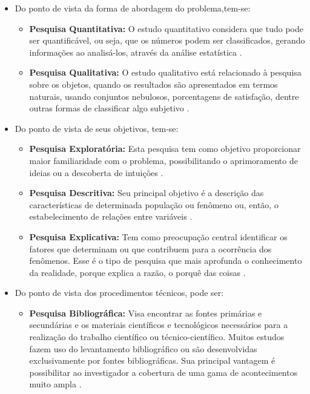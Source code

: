 \begin{apendicesenv}
\begin{itemize}
	\item Do ponto de vista da forma de abordagem do problema,tem-se:
		\begin{itemize}
			\item \textbf{Pesquisa Quantitativa:} O estudo quantitativo considera que tudo pode ser quantificável, ou seja, que os números podem ser classificados, gerando informações ao analisá-los, através da análise estatística \cite{Travassos:2002}.
			\item \textbf{Pesquisa Qualitativa:} O estudo qualitativo está relacionado à pesquisa sobre os objetos, quando os resultados são apresentados em termos naturais, usando conjuntos nebulosos, porcentagens de satisfação, dentre outras formas de classificar algo subjetivo \cite{Travassos:2002}.
		\end{itemize}

	\item Do ponto de vista de seus objetivos, tem-se:
		\begin{itemize}
			\item \textbf{Pesquisa Exploratória:} Esta pesquisa tem como objetivo proporcionar maior familiaridade com o problema, possibilitando o aprimoramento de ideias ou a descoberta de intuições \cite{Gil:2010}.
			\item \textbf{Pesquisa Descritiva:} Seu principal objetivo é a descrição das características de determinada população ou fenômeno ou, então, o estabelecimento de relações entre variáveis \cite{Gil:2010}.
			\item \textbf{Pesquisa Explicativa:} Tem como preocupação central identificar os fatores que determinam ou que contribuem para a ocorrência dos fenômenos. Esse é o tipo de pesquisa que mais aprofunda o conhecimento da realidade, porque explica a razão, o porquê das coisas \cite{Gil:2010}.
		\end{itemize}

	\item Do ponto de vista dos procedimentos técnicos, pode ser:
		\begin{itemize}
			\item \textbf{Pesquisa Bibliográfica:} Visa encontrar as fontes primárias e secundárias e os materiais científicos e tecnológicos necessários para a realização do trabalho científico ou técnico-científico. Muitos estudos fazem uso do levantamento bibliográfico ou são desenvolvidas exclusivamente por fontes bibliográficas. Sua principal vantagem é possibilitar ao investigador a cobertura de uma gama de acontecimentos muito ampla \cite{Silva:Tafner:2007}.


\end{itemize}
\end{itemize}
\end{apendicesenv}
